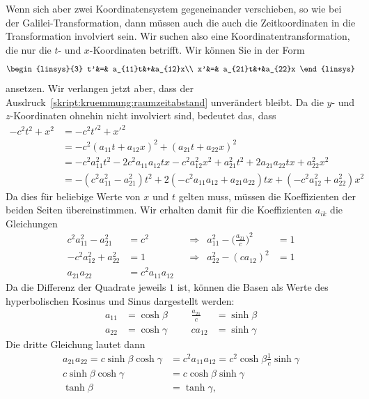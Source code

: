 Wenn sich aber zwei Koordinatensystem gegeneinander verschieben,
so wie bei der Galilei-Transformation, dann müssen auch die auch
die Zeitkoordinaten in die Transformation involviert sein.
Wir suchen also eine Koordinatentransformation, die nur die
$t$- und $x$-Koordinaten betrifft.
Wir können Sie in der Form
\begin{equation}
\begin{linsys}{3}
t'&=& a_{11}t&+&a_{12}x\\
x'&=& a_{21}t&+&a_{22}x
\end{linsys}
\end{equation}
ansetzen.
Wir verlangen jetzt aber, dass der
Ausdruck~\eqref{skript:kruemmung:raumzeitabstand}
unverändert bleibt.
Da die $y$- und $z$-Koordinaten ohnehin nicht involviert sind, bedeutet
das, dass
\begin{align*}
-c^2t^2 + x^2
&=
-c^2t'^2 + x'^2
\\
&=
-c^2(a_{11}t+a_{12}x)^2 + (a_{21}t+a_{22}x)^2
\\
&=
-c^2a_{11}^2t^2 -2c^2a_{11}a_{12}tx -c^2a_{12}^2x^2
+a_{21}^2t^2+2a_{21}a_{22}tx+a_{22}^2x^2
\\
&=
-(c^2a_{11}^2 - a_{21}^2)t^2
+2(-c^2a_{11}a_{12}+a_{21}a_{22})tx
+(-c^2a_{12}^2 + a_{22}^2)x^2
\end{align*}
Da dies für beliebige Werte von $x$ und $t$ gelten muss, müssen die
Koeffizienten der beiden Seiten übereinstimmen. 
Wir erhalten damit für die Koeffizienten $a_{ik}$ die Gleichungen
\[
\begin{aligned}
c^2a_{11}^2-a_{21}^2&=c^2
&&\Rightarrow&
a_{11}^2
-
\biggl(\frac{a_{21}}{c}\biggr)^2
&=1
\\
-c^2a_{12}^2+a_{22}^2&=1
&&\Rightarrow
&
a_{22}^2 - (ca_{12})^2&=1
\\
a_{21}a_{22}&=c^2a_{11}a_{12}
\end{aligned}
\]
Da die Differenz der Quadrate jeweils $1$ ist, können die Basen
als Werte des hyperbolischen Kosinus und Sinus dargestellt werden:
\[
\begin{aligned}
a_{11}&=\cosh\beta  &&&\frac{a_{21}}{c}&=\sinh\beta
\\
a_{22}&=\cosh\gamma &&&ca_{12}&=\sinh\gamma
\end{aligned}
\]
Die dritte Gleichung lautet dann
\begin{align*}
a_{21}a_{22}=c\sinh\beta\cosh\gamma
&=
c^2a_{11}a_{12}=c^2\cosh\beta\frac1c\sinh\gamma
\\
c\sinh\beta\cosh\gamma
&=
c\cosh\beta\sinh\gamma
\\
\tanh\beta&=\tanh\gamma,
\end{align*}

